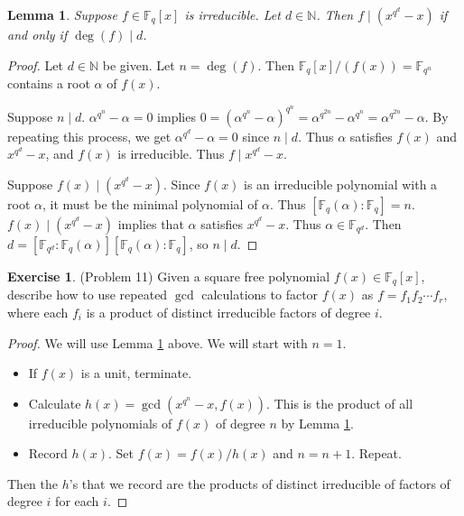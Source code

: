 \documentclass[12pt, psamsfonts]{amsart}
\newtheorem{lem}[thm]{Lemma}
\theoremstyle{definition}
\newtheorem*{exer}{Exercise}
\theoremstyle{remark}
\numberwithin{equation}{section}
\begin{document}
\begin{lem}\label{mylem}
  Suppose $f \in \mathbb{F}_q[x]$ is irreducible.
  Let $d \in \mathbb{N}$.
  Then $f \mid (x^{q^d} - x)$ if and only if $\deg(f) \mid d$.
\end{lem}

\begin{proof}
  Let $d \in \mathbb{N}$ be given.
  Let $n = \deg(f)$.
  Then $\mathbb{F}_q[x]/(f(x)) = \mathbb{F}_{q^n}$ contains a root $\alpha$ of $f(x)$.

  Suppose $n \mid d$.
  $\alpha^{q^n} - \alpha = 0$ implies $0 = (\alpha^{q^n} - \alpha)^{q^n} = \alpha^{q^{2n}} - \alpha^{q^n} = \alpha^{q^{2n}} - \alpha$.
  By repeating this process, we get $\alpha^{q^{d}} - \alpha = 0$ since $n \mid d$.
  Thus $\alpha$ satisfies $f(x)$ and $x^{q^d} - x$, and $f(x)$ is irreducible.
  Thus $f \mid x^{q^d} - x$.

  Suppose $f(x) \mid (x^{q^d} - x)$.
  Since $f(x)$ is an irreducible polynomial with a root $\alpha$, it must be the minimal polynomial of $\alpha$.
  Thus $[\mathbb{F}_q(\alpha):\mathbb{F}_q] = n$.
  $f(x) \mid (x^{q^d} - x)$ implies that $\alpha$ satisfies $x^{q^d} - x$.
  Thus $\alpha \in \mathbb{F}_{q^d}$.
  Then $d = [\mathbb{F}_{q^d}:\mathbb{F}_q(\alpha)][\mathbb{F}_q(\alpha):\mathbb{F}_q]$, so $n \mid d$.
\end{proof}

\begin{exer}{(Problem 11)}
  Given a square free polynomial $f(x) \in \mathbb{F}_q[x]$, describe how to use repeated $\gcd$ calculations to factor $f(x)$ as $f = f_1f_2 \cdots f_r$, where each $f_i$ is a product of distinct irreducible factors of degree $i$.
\end{exer}

\begin{proof}
  We will use Lemma \ref{mylem} above.
  We will start with $n = 1$.
  \begin{itemize}
    \item
      If $f(x)$ is a unit, terminate.
    \item
      Calculate $h(x) = \gcd(x^{q^n} - x, f(x))$.
      This is the product of all irreducible polynomials of $f(x)$ of degree $n$ by Lemma \ref{mylem}.
    \item
      Record $h(x)$.
      Set $f(x) = f(x) / h(x)$ and $n = n + 1$.
      Repeat.
  \end{itemize}
  Then the $h$'s that we record are the products of distinct irreducible of factors of degree $i$ for each $i$.
\end{proof}
\end{document}
